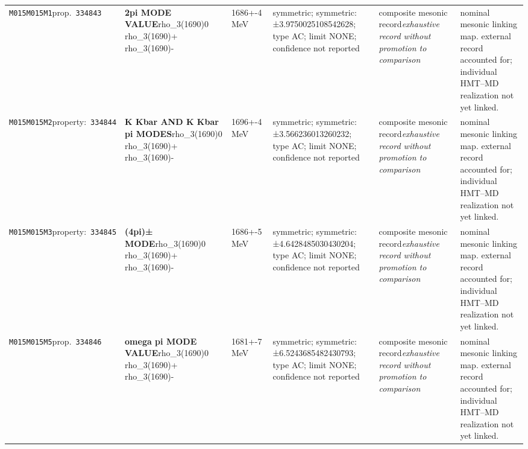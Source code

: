\begin{landscape}
\begin{longtable}{L{1.85cm}L{4.45cm}L{2.35cm}L{4.05cm}L{3.35cm}L{7.15cm}}
\texttt{M015}\newline \texttt{M015M1}\newline prop.\ \texttt{334843} & \textbf{2pi MODE VALUE}\newline rho\_\allowbreak{}3(1690)0 \textbar{}\allowbreak{} rho\_\allowbreak{}3(1690)+ \textbar{}\allowbreak{} rho\_\allowbreak{}3(1690)- & 1686+-4\,MeV & symmetric; symmetric: ±3.9750025108542628; type AC; limit NONE; confidence not reported & composite mesonic record\newline \emph{exhaustive record without promotion to comparison} & nominal mesonic linking map. external record accounted for; individual HMT--MD realization not yet linked. \\
\texttt{M015}\newline \texttt{M015M2}\newline property:\ \texttt{334844} & \textbf{K Kbar AND K Kbar pi MODES}\newline rho\_\allowbreak{}3(1690)0 \textbar{}\allowbreak{} rho\_\allowbreak{}3(1690)+ \textbar{}\allowbreak{} rho\_\allowbreak{}3(1690)- & 1696+-4\,MeV & symmetric; symmetric: ±3.566236013260232; type AC; limit NONE; confidence not reported & composite mesonic record\newline \emph{exhaustive record without promotion to comparison} & nominal mesonic linking map. external record accounted for; individual HMT--MD realization not yet linked. \\
\texttt{M015}\newline \texttt{M015M3}\newline property:\ \texttt{334845} & \textbf{(4pi)± MODE}\newline rho\_\allowbreak{}3(1690)0 \textbar{}\allowbreak{} rho\_\allowbreak{}3(1690)+ \textbar{}\allowbreak{} rho\_\allowbreak{}3(1690)- & 1686+-5\,MeV & symmetric; symmetric: ±4.6428485030430204; type AC; limit NONE; confidence not reported & composite mesonic record\newline \emph{exhaustive record without promotion to comparison} & nominal mesonic linking map. external record accounted for; individual HMT--MD realization not yet linked. \\
\texttt{M015}\newline \texttt{M015M5}\newline prop.\ \texttt{334846} & \textbf{omega pi MODE VALUE}\newline rho\_\allowbreak{}3(1690)0 \textbar{}\allowbreak{} rho\_\allowbreak{}3(1690)+ \textbar{}\allowbreak{} rho\_\allowbreak{}3(1690)- & 1681+-7\,MeV & symmetric; symmetric: ±6.5243685482430793; type AC; limit NONE; confidence not reported & composite mesonic record\newline \emph{exhaustive record without promotion to comparison} & nominal mesonic linking map. external record accounted for; individual HMT--MD realization not yet linked. \\

\end{longtable}
\end{landscape}
